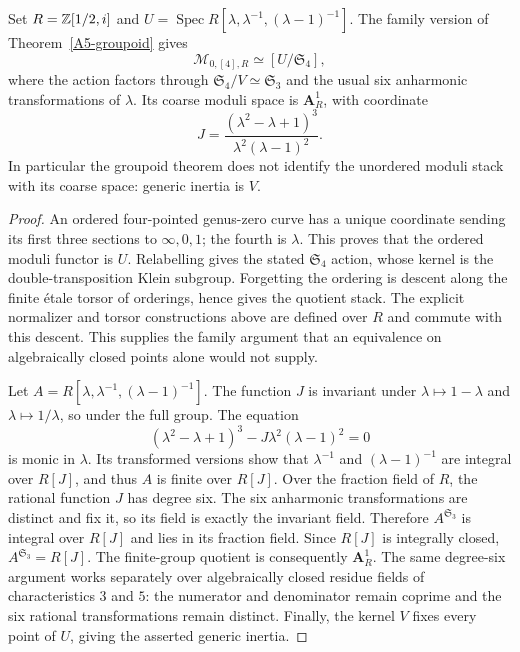 \begin{proposition}\label{A5-moduli}
Set $R={\mathbb{Z}}[1/2,i]$ and $U=\operatorname{Spec}R[\lambda,\lambda^{-1},(\lambda-1)^{-1}]$. The family version of Theorem~\ref{A5-groupoid} gives
\[
 \mathcal M_{0,[4],R}\simeq[U/\mathfrak S_4],
\]
where the action factors through $\mathfrak S_4/V\simeq\mathfrak S_3$ and the usual six anharmonic transformations of $\lambda$. Its coarse moduli space is $\mathbf A^1_R$, with coordinate
\[
 J=\frac{(\lambda^2-\lambda+1)^3}{\lambda^2(\lambda-1)^2}.
\]
In particular the groupoid theorem does not identify the unordered moduli stack with its coarse space: generic inertia is $V$.
\end{proposition}
\begin{proof}
An ordered four-pointed genus-zero curve has a unique coordinate sending its first three sections to $\infty,0,1$; the fourth is $\lambda$. This proves that the ordered moduli functor is $U$. Relabelling gives the stated $\mathfrak S_4$ action, whose kernel is the double-transposition Klein subgroup. Forgetting the ordering is descent along the finite \'etale torsor of orderings, hence gives the quotient stack. The explicit normalizer and torsor constructions above are defined over $R$ and commute with this descent. This supplies the family argument that an equivalence on algebraically closed points alone would not supply.

Let $A=R[\lambda,\lambda^{-1},(\lambda-1)^{-1}]$. The function $J$ is invariant under $\lambda\mapsto1-\lambda$ and $\lambda\mapsto1/\lambda$, so under the full group. The equation
\[
 (\lambda^2-\lambda+1)^3-J\lambda^2(\lambda-1)^2=0
\]
is monic in $\lambda$. Its transformed versions show that $\lambda^{-1}$ and $(\lambda-1)^{-1}$ are integral over $R[J]$, and thus $A$ is finite over $R[J]$. Over the fraction field of $R$, the rational function $J$ has degree six. The six anharmonic transformations are distinct and fix it, so its field is exactly the invariant field. Therefore $A^{\mathfrak S_3}$ is integral over $R[J]$ and lies in its fraction field. Since $R[J]$ is integrally closed, $A^{\mathfrak S_3}=R[J]$. The finite-group quotient is consequently $\mathbf A^1_R$. The same degree-six argument works separately over algebraically closed residue fields of characteristics $3$ and $5$: the numerator and denominator remain coprime and the six rational transformations remain distinct. Finally, the kernel $V$ fixes every point of $U$, giving the asserted generic inertia.
\end{proof}


